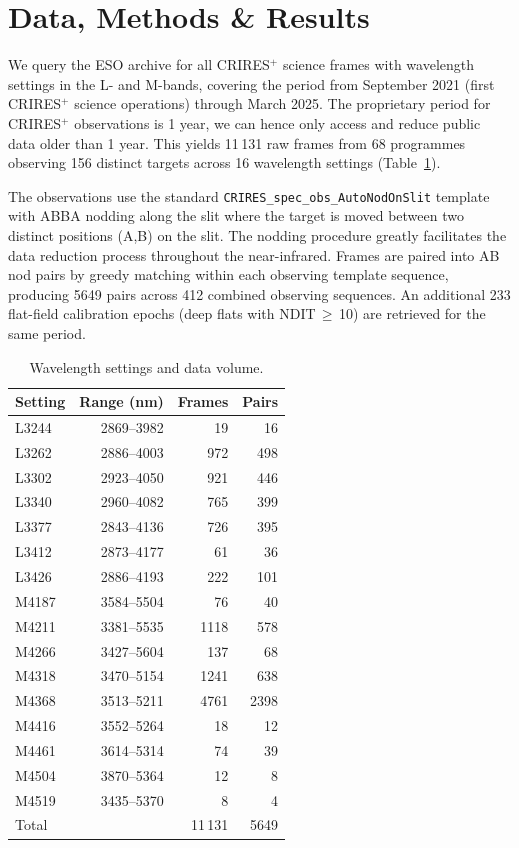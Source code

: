 \documentclass{aa}
\newcommand{\crires}{CRIRES$^+$}
\begin{document}
\section{Data,  Methods \& Results}
\label{sec:data-methods}

We query the ESO archive for all \crires{} science frames with
wavelength settings in the L- and M-bands, covering the period from
September 2021 (first \crires{} science operations) through March 2025. The proprietary
period for \crires{} observations is 1 year, we can hence only access and reduce
public data older than 1 year.
This yields 11\,131 raw frames from 68 programmes observing 156 distinct
targets across 16 wavelength settings (Table~\ref{tab:settings}).

The observations use the standard \texttt{CRIRES\_spec\_obs\_AutoNodOnSlit}
template with ABBA nodding along the slit where the target is moved between two
distinct positions (A,B) on the slit. The nodding procedure greatly facilitates
the data reduction process throughout the near-infrared. Frames are paired into AB
nod pairs by greedy matching within each observing template sequence,
producing 5649 pairs across 412 combined observing sequences. An
additional 233 flat-field calibration epochs (deep flats with
NDIT\,$\geq$\,10) are retrieved for the same period.

\begin{table}
\caption{Wavelength settings and data volume.}
\label{tab:settings}
\centering
\begin{tabular}{lrrr}
\hline\hline
Setting & Range (nm) & Frames & Pairs \\
\hline
L3244 & 2869--3982 & 19 & 16 \\
L3262 & 2886--4003 & 972 & 498 \\
L3302 & 2923--4050 & 921 & 446 \\
L3340 & 2960--4082 & 765 & 399 \\
L3377 & 2843--4136 & 726 & 395 \\
L3412 & 2873--4177 & 61 & 36 \\
L3426 & 2886--4193 & 222 & 101 \\
\hline
M4187 & 3584--5504 & 76 & 40 \\
M4211 & 3381--5535 & 1118 & 578 \\
M4266 & 3427--5604 & 137 & 68 \\
M4318 & 3470--5154 & 1241 & 638 \\
M4368 & 3513--5211 & 4761 & 2398 \\
M4416 & 3552--5264 & 18 & 12 \\
M4461 & 3614--5314 & 74 & 39 \\
M4504 & 3870--5364 & 12 & 8 \\
M4519 & 3435--5370 & 8 & 4 \\
\hline
Total & & 11\,131 & 5649 \\
\hline
\end{tabular}
\end{table}
\end{document}

